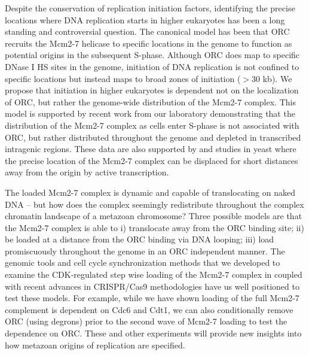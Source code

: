 Despite the conservation of replication initiation factors, identifying the precise locations where DNA replication starts in higher eukaryotes has been a long standing and controversial question\citep{Prioleau2016-bj}.   The canonical model has been that ORC recruits the Mcm2-7 helicase to specific locations in the genome to function as potential origins in the subsequent S-phase. Although ORC does map to specific DNase I HS sites in the genome\citep{Miotto2016-jt}, initiation of DNA replication is not confined to specific locations but instead maps to broad zones of initiation ($>$30 kb)\citep{Petryk2016-rr}. We propose that initiation in higher eukaryotes is dependent not on the localization of ORC, but rather the genome-wide distribution of the Mcm2-7 complex. This model is supported by recent work from our laboratory demonstrating that the distribution of the Mcm2-7 complex as \dros cells enter S-phase is not associated with ORC, but rather distributed throughout the genome and depleted in transcribed intragenic regions\citep{Powell2015-af}.  These data are also supported by \invitro and \invivo studies in yeast where the precise location of the Mcm2-7 complex can be displaced for short distances away from the origin by active transcription\citep{Gros2015-oo}.  

The loaded Mcm2-7 complex is dynamic and capable of translocating on naked DNA -- but how does the complex seemingly redistribute throughout the complex chromatin landscape of a metazoan chromosome?  Three possible models are that the Mcm2-7 complex is able to i) translocate away from the ORC binding site; ii) be loaded at a distance from the ORC binding via DNA looping; iii) load promiscuously throughout the genome in an ORC independent manner\citep{Shibata2016-uc}.  The genomic tools and cell cycle synchronization methods that we developed to examine the CDK-regulated step wise loading of the Mcm2-7 complex in \dros coupled with recent advances in CRISPR/Cas9 methodologies\citep{Kunzelmann2016-sf} have us well positioned to test these models.  For example, while we have shown loading of the full Mcm2-7 complement is dependent on Cdc6 and Cdt1\citep{Powell2015-af}, we can also conditionally remove ORC (using degrons) prior to the second wave of Mcm2-7 loading to test the dependence on ORC.  These and other experiments will provide new insights into how metazoan origins of replication are specified.   






